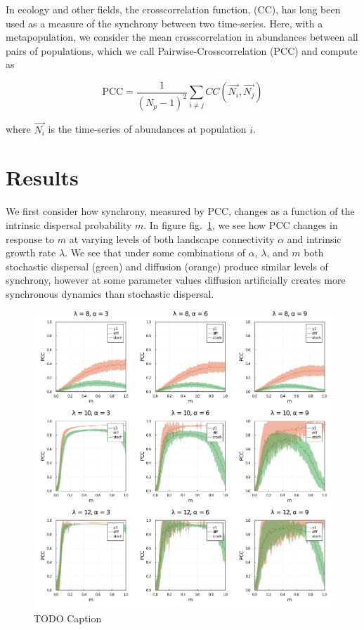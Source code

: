 \documentclass[10pt,oneside]{article}
\makeatletter
\def\maxwidth{\ifdim\Gin@nat@width>\linewidth\linewidth
\else\Gin@nat@width\fi}
\let\Oldincludegraphics\includegraphics
\renewcommand{\includegraphics}[1]{\Oldincludegraphics[width=\maxwidth]{#1}}
\makeatother
\begin{document}
In ecology and other fields, the crosscorrelation function, (CC), has
long been used as a measure of the synchrony between two time-series.
Here, with a metapopulation, we consider the mean crosscorrelation in
abundances between all pairs of populations, which we call
Pairwise-Crosscorrelation (\(\text{PCC}\)) and compute as

\[\text{PCC}=\frac{1}{(N_p-1)^2}\sum_{i \neq j} CC(\vec{N_i},\vec{N_j})\]

where \(\vec{N_i}\) is the time-series of abundances at population
\(i\).

\hypertarget{results}{%
\section{Results}\label{results}}

We first consider how synchrony, measured by \(\text{PCC}\), changes as
a function of the intrinsic dispersal probability \(m\). In figure
fig.~\ref{fig:migration_gradient}, we see how \(\text{PCC}\) changes in
response to \(m\) at varying levels of both landscape connectivity
\(\alpha\) and intrinsic growth rate \(\lambda\). We see that under some
combinations of \(\alpha\), \(\lambda\), and \(m\) both stochastic
dispersal (green) and diffusion (orange) produce similar levels of
synchrony, however at some parameter values diffusion artificially
creates more synchronous dynamics than stochastic dispersal.

\begin{figure}
\hypertarget{fig:migration_gradient}{%
\centering
\includegraphics{./figures/migration_gradient_panels.png}
\caption{TODO Caption}\label{fig:migration_gradient}
}
\end{figure}
\end{document}
